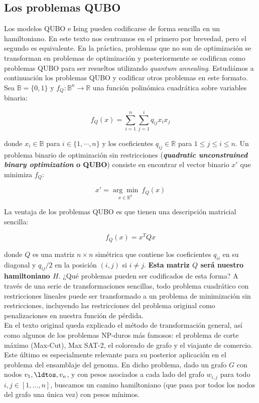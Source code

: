 \documentclass[11pt]{article}
\newcommand*{\B}{\mathbb{B}}
\newcommand*{\R}{\mathbb{R}}
\begin{document}
\subsection{Los problemas QUBO}

Los modelos QUBO e Ising pueden codificarse de forma sencilla en un hamiltoniano. En este texto nos centramos en el primero por brevedad, pero el segundo es equivalente. En la práctica, problemas que no son de optimización se transforman en problemas de optimización y posteriormente se codifican como problemas QUBO para ser resueltos utilizando \emph{quantum annealing}. Estudiámos a continuación los problemas QUBO y codificar otros problemas en este formato. \\

Sea $\B = \{0,1\}$ y $f_Q: \B^n \longrightarrow \R $ una función polinómica cuadrática sobre variables binaria:

\[ f_Q(x) = \sum_{i=1}^n \sum_{j=1}^i q_{ij} x_i x_j \]

donde $x_i \in \B$ para $i \in \{1, \cdots, n\}$ y los coeficientes $q_{ij} \in \R$ para $1 \leq j \leq i \leq n$. Un problema binario de optimización sin restricciones (\textbf{\emph{quadratic unconstrained binary optimization} o QUBO}) consiste en encontrar el vector binario $x'$ que minimiza $f_Q$:

\[ x' = \underset {x \in \B^n }{\arg \min} ~ f_Q(x) \]

La ventaja de los problemas QUBO es que tienen una descripción matricial sencilla:

\[ f_Q(x) = x^T Q x \]

donde $Q$ es una matriz $n \times n$ simétrica que contiene los coeficientes $q_{ii}$ en su diagonal y $q_{ij} / 2$ en la posición $(i,j)$ si $i \neq j$. \textbf{Esta matriz $Q$ será nuestro hamiltoniano $H$}. ¿Qué problemas pueden ser codificados de esta forma? A través de una serie de transformaciones sencillas, todo problema cuadrático con restricciones lineales puede ser transformado a un problema de minimización sin restricciones, incluyendo las restricciones del problema original como penalizaciones en nuestra función de pérdida. \\

En el texto original queda explicado el método de transformación general, así como algunos de los problemas NP-duros más famosos: el problema de corte máximo (Max-Cut), Max SAT-2, el coloreado de grafo y el viajante de comercio. \\

Este último es especialmente relevante para su posterior aplicación en el problema del ensamblaje del genoma. En dicho problema, dado un grafo $G$ con nodos $v_1, \ldtos, v_n$, y con pesos asociados a cada lado del grafo $w_{i,j}$ para todo $i,j \in [1, \ldots, n]$, buscamos un camino hamiltoniano (que pasa por todos los nodos del grafo una única vez) con pesos mínimos. \\
\end{document}
